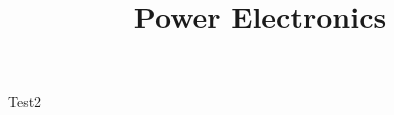 \documentclass{../course_template/exerciseClass}
\title{Power Electronics}
\begin{document}
Test2
\end{document}
